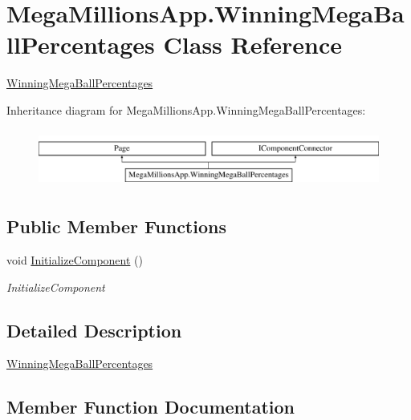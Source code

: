 \hypertarget{class_mega_millions_app_1_1_winning_mega_ball_percentages}{}\section{Mega\+Millions\+App.\+Winning\+Mega\+Ball\+Percentages Class Reference}
\label{class_mega_millions_app_1_1_winning_mega_ball_percentages}


\hyperlink{class_mega_millions_app_1_1_winning_mega_ball_percentages}{Winning\+Mega\+Ball\+Percentages}  


Inheritance diagram for Mega\+Millions\+App.\+Winning\+Mega\+Ball\+Percentages\+:\begin{figure}[H]
\begin{center}
\leavevmode
\includegraphics[height=1.924399cm]{class_mega_millions_app_1_1_winning_mega_ball_percentages}
\end{center}
\end{figure}
\subsection*{Public Member Functions}
\begin{DoxyCompactItemize}
\item 
void \hyperlink{class_mega_millions_app_1_1_winning_mega_ball_percentages_a76641ed4712d4a4ed8f3604758a219e2}{Initialize\+Component} ()
\begin{DoxyCompactList}\small\item\em Initialize\+Component \end{DoxyCompactList}\end{DoxyCompactItemize}


\subsection{Detailed Description}
\hyperlink{class_mega_millions_app_1_1_winning_mega_ball_percentages}{Winning\+Mega\+Ball\+Percentages} 



\subsection{Member Function Documentation}
\mbox{\label{class_mega_millions_app_1_1_winning_mega_ball_percentages_a76641ed4712d4a4ed8f3604758a219e2}} 
